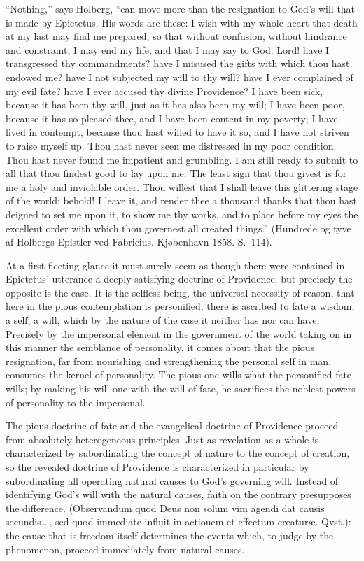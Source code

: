 \documentclass[12pt]{book}
\newcommand{\opage}[1]{\marginnote{\footnotesize\textit{[#1]}}}
\begin{document}
``Nothing,'' says Holberg, ``can move more than the resignation to God's
will that is made by Epictetus. His words are these: I wish with my
whole heart that death at my last may find me prepared, so that without
confusion, without hindrance and constraint, I may end my life, and that
I may say to God: Lord! have I transgressed thy commandments? have I
misused the gifts with which thou hast endowed me? have I not subjected
my will to thy will? have I ever complained of my evil fate? have I ever
accused thy divine Providence? I have been sick, because it has been thy
will, just as it has also been my will; I have been poor, because it has
so pleased thee, and I have been content in my
\opage{221}\setcounter{footnote}{0}%
poverty; I have lived in contempt, because thou hast willed to have it
so, and I have not striven to raise myself up. Thou hast never seen me
distressed in my poor condition. Thou hast never found me impatient and
grumbling. I am still ready to submit to all that thou findest good to
lay upon me. The least sign that thou givest is for me a holy and
inviolable order. Thou willest that I shall leave this glittering stage
of the world: behold! I leave it, and render thee a thousand thanks that
thou hast deigned to set me upon it, to show me thy works, and to place
before my eyes the excellent order with which thou governest all created
things.'' (Hundrede og tyve af Holbergs Epistler ved Fabricius.
Kjøbenhavn 1858. S.~114).

At a first fleeting glance it must surely seem as though there were
contained in Epictetus' utterance a deeply satisfying doctrine of
Providence; but precisely the opposite is the case. It is the selfless
being, the universal necessity of reason, that here in the pious
contemplation is personified; there is ascribed to fate a wisdom, a
self, a will, which by the nature of the case it neither has nor can
have. Precisely by the impersonal element in the government of the world
taking on in this manner the semblance of personality, it comes about
that the pious resignation, far from nourishing and strengthening the
personal self in man, consumes the kernel of personality. The pious one
wills what the personified fate wills; by making his will one with the
will of fate, he sacrifices the noblest powers of personality to the
impersonal.

The pious doctrine of fate and the evangelical doctrine of Providence
proceed from absolutely heterogeneous principles. Just as revelation as
a whole is characterized by subordinating the concept of nature to the
concept of
\opage{222}\setcounter{footnote}{0}%
creation, so the revealed doctrine of Providence is characterized in
particular by subordinating all operating natural causes to God's
governing will. Instead of identifying God's will with the natural
causes, faith on the contrary presupposes the difference.
(Observandum quod Deus non solum vim agendi dat causis secundis\,\ldots,
sed quod immediate influit in actionem et effectum creaturæ. Qvst.):
the cause that is freedom itself determines the events which, to judge
by the phenomenon, proceed immediately from natural causes.
\end{document}
